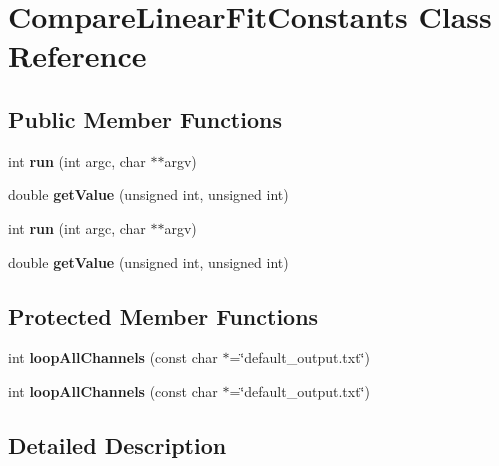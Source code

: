 \section{Compare\-Linear\-Fit\-Constants Class Reference}
\label{classCompareLinearFitConstants}
\subsection*{Public Member Functions}
\begin{DoxyCompactItemize}
\item 
int {\bfseries run} (int argc, char $\ast$$\ast$argv)\label{classCompareLinearFitConstants_a0861d86c85fb45e97cc2f49bc6bf5141}

\item 
double {\bfseries get\-Value} (unsigned int, unsigned int)\label{classCompareLinearFitConstants_ab71761e53e6d2756b76c2163a078b9b6}

\item 
int {\bfseries run} (int argc, char $\ast$$\ast$argv)\label{classCompareLinearFitConstants_a0861d86c85fb45e97cc2f49bc6bf5141}

\item 
double {\bfseries get\-Value} (unsigned int, unsigned int)\label{classCompareLinearFitConstants_ab71761e53e6d2756b76c2163a078b9b6}

\end{DoxyCompactItemize}
\subsection*{Protected Member Functions}
\begin{DoxyCompactItemize}
\item 
int {\bfseries loop\-All\-Channels} (const char $\ast$=\char`\"{}default\-\_\-output.\-txt\char`\"{})\label{classCompareLinearFitConstants_a26546f114aaae4062c5581c83ef488a1}

\item 
int {\bfseries loop\-All\-Channels} (const char $\ast$=\char`\"{}default\-\_\-output.\-txt\char`\"{})\label{classCompareLinearFitConstants_a26546f114aaae4062c5581c83ef488a1}

\end{DoxyCompactItemize}


\subsection{Detailed Description}


